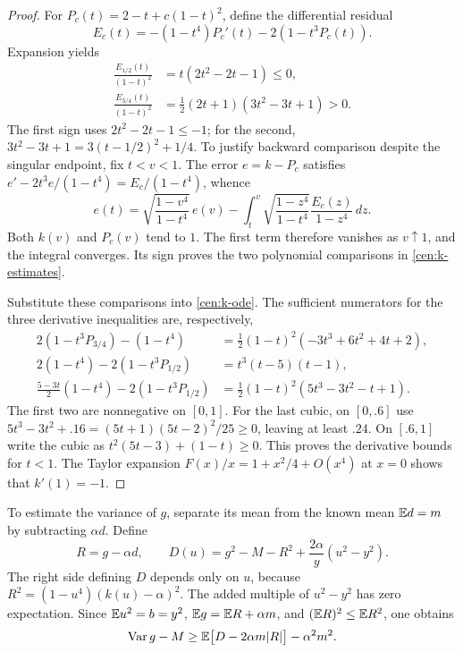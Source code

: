 \begin{proof}
For $P_c(t)=2-t+c(1-t)^2$, define the differential residual
\[
 E_c(t)=-(1-t^4)P_c'(t)-2(1-t^3P_c(t)).
\]
Expansion yields
\begin{align*}
 \frac{E_{1/2}(t)}{(1-t)^2}&=t(2t^2-2t-1)\le0,\\
 \frac{E_{3/4}(t)}{(1-t)^2}
 &=\tfrac12(2t+1)(3t^2-3t+1)>0.
\end{align*}
The first sign uses $2t^2-2t-1\le-1$; for the second,
$3t^2-3t+1=3(t-1/2)^2+1/4$.
To justify backward comparison despite the singular endpoint, fix
$t<v<1$.  The error $e=k-P_c$ satisfies
$e'-2t^3e/(1-t^4)=E_c/(1-t^4)$, whence
\[
 e(t)=\sqrt{\frac{1-v^4}{1-t^4}}\,e(v)
 -\int_t^v\sqrt{\frac{1-z^4}{1-t^4}}
                   \frac{E_c(z)}{1-z^4}\,dz.
\]
Both $k(v)$ and $P_c(v)$ tend to $1$.  The first term therefore vanishes
as $v\uparrow1$, and the integral converges.  Its sign proves the two
polynomial comparisons in \eqref{cen:k-estimates}.

Substitute these comparisons into \eqref{cen:k-ode}.  The sufficient
numerators for the three derivative inequalities are, respectively,
\begin{align*}
 2(1-t^3P_{3/4})-(1-t^4)
   &=\tfrac12(1-t)^2(-3t^3+6t^2+4t+2),\\
 2(1-t^4)-2(1-t^3P_{1/2})
   &=t^3(t-5)(t-1),\\
 \tfrac{5-3t}{2}(1-t^4)-2(1-t^3P_{1/2})
   &=\tfrac12(1-t)^2(5t^3-3t^2-t+1).
\end{align*}
The first two are nonnegative on $[0,1]$.  For the last cubic, on
$[0,.6]$ use
$5t^3-3t^2+.16=(5t+1)(5t-2)^2/25\ge0$, leaving at least $.24$.
On $[.6,1]$ write the cubic as $t^2(5t-3)+(1-t)\ge0$.
This proves the derivative bounds for $t<1$.  The Taylor expansion
$F(x)/x=1+x^2/4+O(x^4)$ at $x=0$ shows that $k'(1)=-1$.
\end{proof}

To estimate the variance of $g$, separate its mean from the known mean
$\mathbb E d=m$ by subtracting $\alpha d$.  Define
\begin{equation}\label{cen:RD}
 R=g-\alpha d,\qquad
 D(u)=g^2-M-R^2+\frac{2\alpha}{y}(u^2-y^2).
\end{equation}
The right side defining $D$ depends only on $u$, because
$R^2=(1-u^4)(k(u)-\alpha)^2$.  The added multiple of $u^2-y^2$
has zero expectation.  Since $\mathbb E u^2=b=y^2$, $\mathbb E g=\mathbb E R+\alpha m$, and
$(\mathbb E R)^2\le\mathbb E R^2$, one obtains
\begin{equation}\label{cen:variance-rearrange}
 \operatorname{Var} g-M\ge\mathbb E\bigl[D-2\alpha m|R|\bigr]-\alpha^2m^2.
\end{equation}

